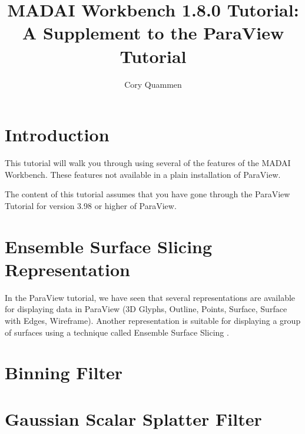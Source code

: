 \documentclass[12pt]{amsart}
\title{MADAI Workbench 1.8.0 Tutorial: \\A Supplement to the ParaView Tutorial}
\author{Cory Quammen}
\date{} %
\begin{document}
\maketitle
\tableofcontents

\section{Introduction}

This tutorial will walk you through using several of the features of the MADAI Workbench. These features not available in a plain installation of ParaView.

The content of this tutorial assumes that you have gone through the ParaView Tutorial for version 3.98 or higher of ParaView.

\section{Ensemble Surface Slicing Representation}

In the ParaView tutorial, we have seen that several representations are available for displaying data in ParaView (3D Glyphs, Outline, Points, Surface, Surface with Edges, Wireframe). Another representation is suitable for displaying a group of surfaces using a technique called Ensemble Surface Slicing \cite{Oluwafemi2012}.

\section{Binning Filter}

\section{Gaussian Scalar Splatter Filter}

\section{}



\end{document}

